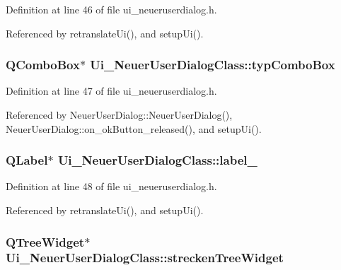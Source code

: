 Definition at line 46 of file ui\_\-neueruserdialog.h.

Referenced by retranslateUi(), and setupUi().\hypertarget{class_ui___neuer_user_dialog_class_8710526a0d5b3dd714dc2991520a33e4}{
\subsubsection[typComboBox]{\setlength{\rightskip}{0pt plus 5cm}QComboBox$\ast$ {\bf Ui\_\-NeuerUserDialogClass::typComboBox}}}
\label{class_ui___neuer_user_dialog_class_8710526a0d5b3dd714dc2991520a33e4}




Definition at line 47 of file ui\_\-neueruserdialog.h.

Referenced by NeuerUserDialog::NeuerUserDialog(), NeuerUserDialog::on\_\-okButton\_\-released(), and setupUi().\hypertarget{class_ui___neuer_user_dialog_class_49a04c8edaea91e0a4e76ecf69ef3ca9}{
\subsubsection[label\_\-6]{\setlength{\rightskip}{0pt plus 5cm}QLabel$\ast$ {\bf Ui\_\-NeuerUserDialogClass::label\_}}}
\label{class_ui___neuer_user_dialog_class_49a04c8edaea91e0a4e76ecf69ef3ca9}




Definition at line 48 of file ui\_\-neueruserdialog.h.

Referenced by retranslateUi(), and setupUi().\hypertarget{class_ui___neuer_user_dialog_class_2bcaa4e408397905be142139e5bd794d}{
\subsubsection[streckenTreeWidget]{\setlength{\rightskip}{0pt plus 5cm}QTreeWidget$\ast$ {\bf Ui\_\-NeuerUserDialogClass::streckenTreeWidget}}}
\label{class_ui___neuer_user_dialog_class_2bcaa4e408397905be142139e5bd794d}




